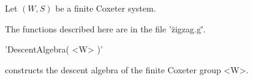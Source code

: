 
Let $(W,  S)$ be  a finite Coxeter  system. 

The functions described here are in the file '\"zigzag.g\"'.

%

'DescentAlgebra( <W> )'

constructs the descent algebra  of the finite Coxeter group  <W>.


